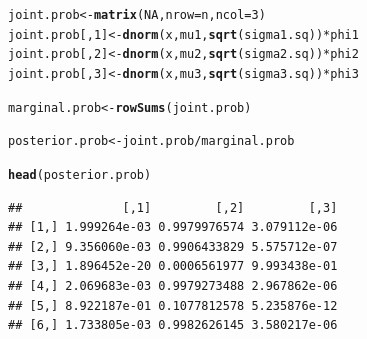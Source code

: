 \documentclass[11pt, a4paper]{article}\usepackage[]{graphicx}\usepackage[]{xcolor}
\makeatletter
\newcommand{\hlnum}[1]{\textcolor[rgb]{0.686,0.059,0.569}{#1}}%
\newcommand{\hlopt}[1]{\textcolor[rgb]{0,0,0}{#1}}%
\newcommand{\hldef}[1]{\textcolor[rgb]{0.345,0.345,0.345}{#1}}%
\newcommand{\hlkwb}[1]{\textcolor[rgb]{0.69,0.353,0.396}{#1}}%
\newcommand{\hlkwc}[1]{\textcolor[rgb]{0.333,0.667,0.333}{#1}}%
\newcommand{\hlkwd}[1]{\textcolor[rgb]{0.737,0.353,0.396}{\textbf{#1}}}%
\newenvironment{kframe}{%
 \def\at@end@of@kframe{}%
 \ifinner\ifhmode%
  \def\at@end@of@kframe{\end{minipage}}%
  \begin{minipage}{\columnwidth}%
 \fi\fi%
 \def\FrameCommand##1{\hskip\@totalleftmargin \hskip-\fboxsep
 \colorbox{shadecolor}{##1}\hskip-\fboxsep
     \hskip-\linewidth \hskip-\@totalleftmargin \hskip\columnwidth}%
 \MakeFramed {\advance\hsize-\width
   \@totalleftmargin\z@ \linewidth\hsize
   \@setminipage}}%
 {\par\unskip\endMakeFramed%
 \at@end@of@kframe}
\newenvironment{knitrout}{}{} %
\makeatother
\begin{document}
\begin{enumerate}
\begin{knitrout}
\color{fgcolor}\begin{kframe}
\begin{alltt}
\hldef{joint.prob} \hlkwb{<-} \hlkwd{matrix}\hldef{(}\hlnum{NA}\hldef{,} \hlkwc{nrow} \hldef{= n,} \hlkwc{ncol} \hldef{=} \hlnum{3}\hldef{)}
\hldef{joint.prob[,}\hlnum{1}\hldef{]} \hlkwb{<-} \hlkwd{dnorm}\hldef{(x, mu1,} \hlkwd{sqrt}\hldef{(sigma1.sq))} \hlopt{*} \hldef{phi1}
\hldef{joint.prob[,}\hlnum{2}\hldef{]} \hlkwb{<-} \hlkwd{dnorm}\hldef{(x, mu2,} \hlkwd{sqrt}\hldef{(sigma2.sq))} \hlopt{*} \hldef{phi2}
\hldef{joint.prob[,}\hlnum{3}\hldef{]} \hlkwb{<-} \hlkwd{dnorm}\hldef{(x, mu3,} \hlkwd{sqrt}\hldef{(sigma3.sq))} \hlopt{*} \hldef{phi3}
\end{alltt}
\end{kframe}
\end{knitrout}

\begin{knitrout}
\color{fgcolor}\begin{kframe}
\begin{alltt}
\hldef{marginal.prob} \hlkwb{<-} \hlkwd{rowSums}\hldef{(joint.prob)}
\end{alltt}
\end{kframe}
\end{knitrout}

\begin{knitrout}
\color{fgcolor}\begin{kframe}
\begin{alltt}
\hldef{posterior.prob} \hlkwb{<-} \hldef{joint.prob} \hlopt{/} \hldef{marginal.prob}
\end{alltt}
\end{kframe}
\end{knitrout}

\begin{knitrout}
\color{fgcolor}\begin{kframe}
\begin{alltt}
\hlkwd{head}\hldef{(posterior.prob)}
\end{alltt}
\begin{verbatim}
##              [,1]         [,2]         [,3]
## [1,] 1.999264e-03 0.9979976574 3.079112e-06
## [2,] 9.356060e-03 0.9906433829 5.575712e-07
## [3,] 1.896452e-20 0.0006561977 9.993438e-01
## [4,] 2.069683e-03 0.9979273488 2.967862e-06
## [5,] 8.922187e-01 0.1077812578 5.235876e-12
## [6,] 1.733805e-03 0.9982626145 3.580217e-06
\end{verbatim}
\end{kframe}
\end{knitrout}


\end{enumerate}
\end{document}
